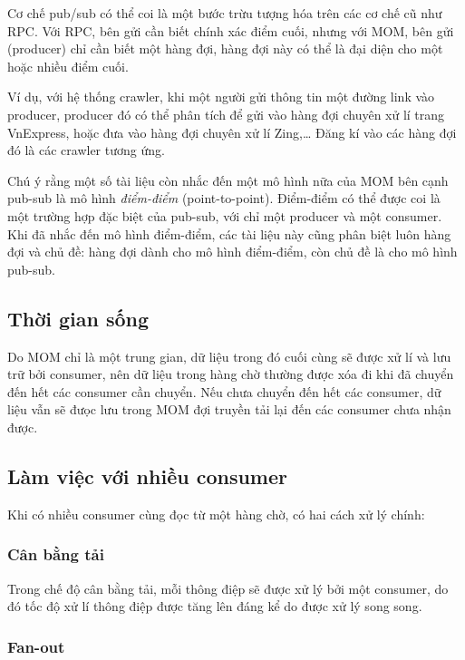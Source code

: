 \documentclass{article}
\begin{document}
Cơ chế pub/sub có thể coi là một bước trừu tượng hóa trên các cơ chế cũ như
RPC\@. Với RPC, bên gửi cần biết chính xác điểm cuối, nhưng với MOM, bên gửi
(producer) chỉ cần biết một hàng đợi, hàng đợi này có thể là đại diện cho một
hoặc nhiều điểm cuối.

Ví dụ, với hệ thống crawler, khi một người gửi thông tin một đường link vào
producer, producer đó có thể phân tích để gửi vào hàng đợi chuyên xử lí trang
VnExpress, hoặc đưa vào hàng đợi chuyên xử lí Zing,\ldots{} Đăng kí vào các hàng
đợi đó là các crawler tương ứng.

Chú ý rằng một số tài liệu còn nhắc đến một mô hình nữa của MOM bên cạnh pub-sub
là mô hình \emph{điểm-điểm} (point-to-point). Điểm-điểm có thể được coi là một
trường hợp đặc biệt của pub-sub, với chỉ một producer và một consumer. Khi đã
nhắc đến mô hình điểm-điểm, các tài liệu này cũng phân biệt luôn hàng đợi và chủ
đề: hàng đợi dành cho mô hình điểm-điểm, còn chủ đề là cho mô hình pub-sub.

\subsection{Thời gian sống}

Do MOM chỉ là một trung gian, dữ liệu trong đó cuối cùng sẽ được xử lí và lưu
trữ bởi consumer, nên dữ liệu trong hàng chờ thường được xóa đi khi đã chuyển
đến hết các consumer cần chuyển. Nếu chưa chuyển đến hết các consumer, dữ liệu
vẫn sẽ đưọc lưu trong MOM đợi truyền tải lại đến các consumer chưa nhận được.

\subsection{Làm việc với nhiều consumer}

Khi có nhiều consumer cùng đọc từ một hàng chờ, có hai cách xử lý chính:

\subsubsection{Cân bằng tải}

Trong chế độ cân bằng tải, mỗi thông điệp sẽ được xử lý bởi một consumer, do đó
tốc độ xử lí thông điệp được tăng lên đáng kể do được xử lý song song.

\subsubsection{Fan-out}
\end{document}
